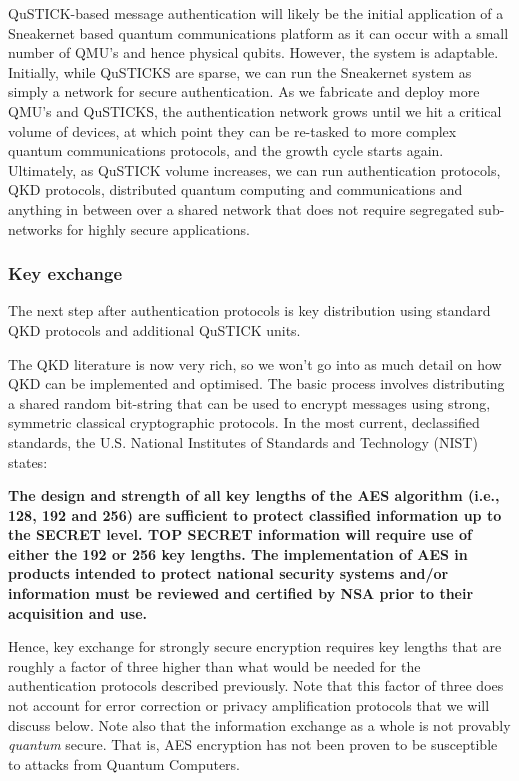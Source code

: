 \documentclass[twocolumn, aps, rmp, amsmath, amssymb, nofootinbib, superscriptaddress, longbibliography, floatfix, table-of-contents, eqsecnum]{revtex4-2}
\begin{document}
QuSTICK-based message authentication will likely be the initial application of a Sneakernet based quantum communications platform as it can occur with a small number of QMU's and hence physical qubits. However, the system is adaptable. Initially, while QuSTICKS are sparse, we can run the Sneakernet system as simply a network for secure authentication. As we fabricate and deploy more QMU's and QuSTICKS, the authentication network grows until we hit a critical volume of devices, at which point they can be re-tasked to more complex quantum communications protocols, and the growth cycle starts again. Ultimately, as QuSTICK volume increases, we can run authentication protocols, QKD protocols, distributed quantum computing and communications and anything in between over a shared network that does not require segregated sub-networks for highly secure applications. 

\subsubsection{Key exchange}

The next step after authentication protocols is key distribution using standard QKD protocols and additional QuSTICK units. 

The QKD literature is now very rich, so we won't go into as much detail on how QKD can be implemented and optimised. The basic process involves distributing a shared random bit-string that can be used to encrypt messages using strong, symmetric classical cryptographic protocols. In the most current, declassified standards, the U.S. National Institutes of Standards and Technology (NIST) states:

\textbf{The design and strength of all key lengths of the AES algorithm (i.e., 128, 192 and 256) are sufficient to protect classified information up to the SECRET level. TOP SECRET information will require use of either the 192 or 256 key lengths. The implementation of AES in products intended to protect national security systems and/or information must be reviewed and certified by NSA prior to their acquisition and use.}

Hence, key exchange for strongly secure encryption requires key lengths that are roughly a factor of three higher than what would be needed for the authentication protocols described previously. Note that this factor of three does not account for error correction or privacy amplification protocols that we will discuss below. Note also that the information exchange as a whole is not provably \textit{quantum} secure. That is, AES encryption has not been proven to be susceptible to attacks from Quantum Computers.
\end{document}
